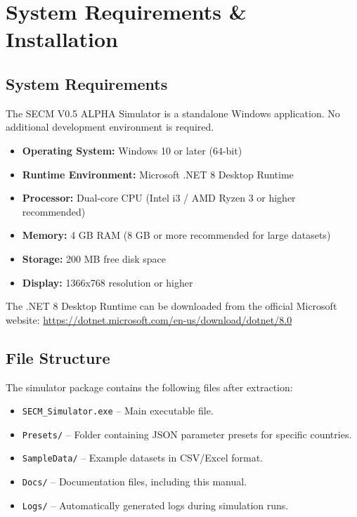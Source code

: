 \documentclass[12pt,a4paper]{article}
\begin{document}
\newpage
\section{System Requirements \& Installation}

\subsection{System Requirements}
The SECM V0.5 ALPHA Simulator is a standalone Windows application.  
No additional development environment is required.

\begin{itemize}
    \item \textbf{Operating System:} Windows 10 or later (64-bit)
    \item \textbf{Runtime Environment:} Microsoft .NET 8 Desktop Runtime
    \item \textbf{Processor:} Dual-core CPU (Intel i3 / AMD Ryzen 3 or higher recommended)
    \item \textbf{Memory:} 4 GB RAM (8 GB or more recommended for large datasets)
    \item \textbf{Storage:} 200 MB free disk space
    \item \textbf{Display:} 1366x768 resolution or higher
\end{itemize}

\noindent
The .NET 8 Desktop Runtime can be downloaded from the official Microsoft website:  
\url{https://dotnet.microsoft.com/en-us/download/dotnet/8.0}

\subsection{File Structure}
The simulator package contains the following files after extraction:
\begin{itemize}
    \item \texttt{SECM\_Simulator.exe} – Main executable file.
    \item \texttt{Presets/} – Folder containing JSON parameter presets for specific countries.
    \item \texttt{SampleData/} – Example datasets in CSV/Excel format.
    \item \texttt{Docs/} – Documentation files, including this manual.
    \item \texttt{Logs/} – Automatically generated logs during simulation runs.
\end{itemize}
\end{document}

